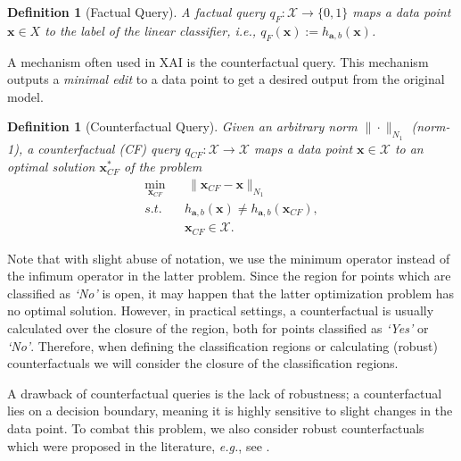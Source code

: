 \documentclass{article}
\newtheorem{definition}[theorem]{Definition}
\begin{document}
\begin{definition}
[Factual Query]
A factual query $q_F:\mathcal{X}\rightarrow\{0,1\}$ maps a data point $\bm{x}\in X$ to the label of the linear classifier, \textit{i.e.},  $q_F(\bm{x}) := h_{\bm{a},b} (\bm{x})$.
\end{definition}

A mechanism often used in XAI is the counterfactual query. This mechanism outputs a \textit{minimal edit} to a data point to get a desired output from the original model.

\begin{definition}[Counterfactual Query]
Given an arbitrary norm $\| \cdot \|_{N_1}$ (norm-1), a counterfactual (CF) query $q_{CF}:\mathcal{X}\rightarrow\mathcal{X}$ maps a data point $\bm{x}\in \mathcal{X}$ to an optimal solution $\bm{x}_{CF}^*$ of the problem
\begin{equation}\label{eq:CF_problem}
    \begin{aligned}
    \min_{\bm{x}_{CF}} & \ \| \bm{x}_{CF}-\bm{x}\|_{N_1} \\
    s.t. \quad & h_{\bm{a},b}(\bm{x})\neq h_{\bm{a},b} (\bm{x}_{CF}), \\
    & \bm{x}_{CF}\in \mathcal X.
\end{aligned}
\end{equation}
\end{definition}

Note that with slight abuse of notation, we use the minimum operator instead of the infimum operator in the latter problem. Since the region for points which are classified as \textit{`No'} is open, it may happen that the latter optimization problem has no optimal solution. However, in practical settings, a counterfactual is usually calculated over the closure of the region, both for points classified as \textit{`Yes'} or \textit{`No'}. Therefore, when defining the classification regions or calculating (robust) counterfactuals we will consider the closure of the classification regions.

A drawback of counterfactual queries is the lack of robustness; a counterfactual lies on a decision boundary, meaning it is highly sensitive to slight changes in the data point. To combat this problem, we also consider robust counterfactuals which were proposed in the literature, \textit{e.g.}, see \cite{maragno2024finding}.
\end{document}
